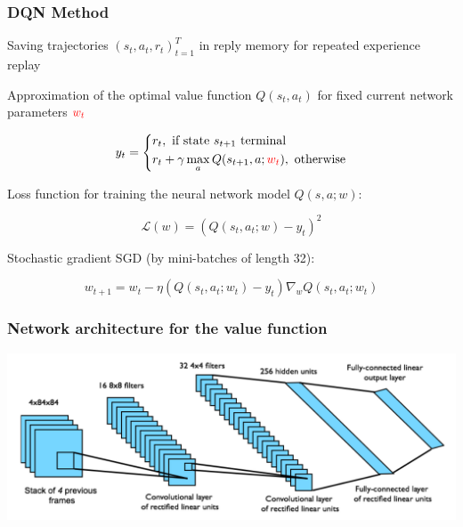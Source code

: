 \documentclass[fullscreen=true, bookmarks=true, hyperref={pdfencoding=unicode}]{beamer}
\begin{document}
\begin{frame}
  \frametitle{DQN Method}

  Saving trajectories $(s_t, a_t, r_t)_{t=1}^T$ in reply memory for repeated experience replay

  \vspace{0.2cm}
  Approximation of the optimal value function $Q(s_t, a_t)$ for fixed current network parameters ${\color{red} w_t}$

  $$y_t =
  \left\{ \begin{aligned}
  &r_t, \text{ if state } s_{t+1} \text{ terminal } \\
  &r_t + \gamma \max_a Q(s_{t+1}, a; {\color{red} w_t}), \text{ otherwise}
  \end{aligned}\right.
  $$

  Loss function for training the neural network model $Q(s, a; w)$:

  $$ \mathscr{L} (w) = (Q(s_t, a_t; w) - y_t)^2 $$

  Stochastic gradient SGD (by mini-batches of length 32):

  $$ w_{t+1} = w_{t} - \eta \left(Q(s_t, a_t; w_t) - y_t\right) \nabla_w Q(s_t, a_t; w_t) $$
\end{frame}


\begin{frame}
  \frametitle{Network architecture for the value function}
  \begin{center}
    \includegraphics[keepaspectratio,
                     width=.85\paperwidth]{dql-cnn-arch.png}
  \end{center}
\end{frame}
\end{document}
